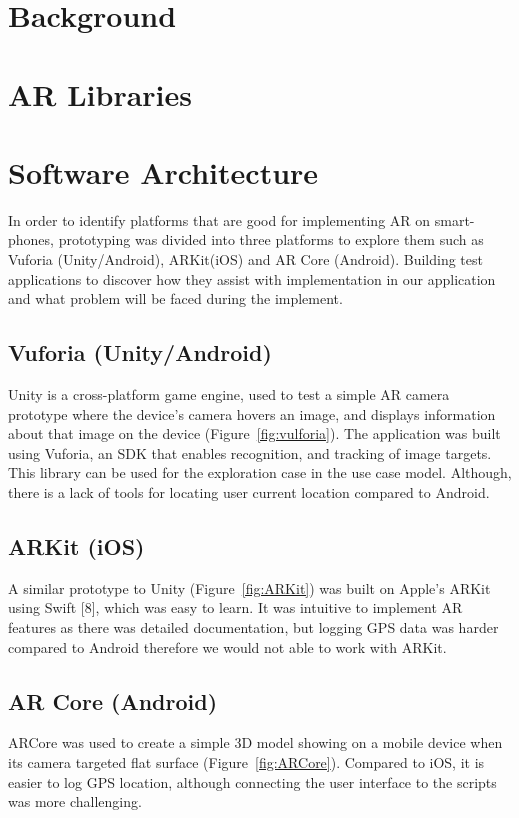 \section{Background}


\section{AR Libraries}


\section{Software Architecture}
In order to identify platforms that are good for implementing AR on smart- phones, prototyping was divided into three platforms to explore them such as Vuforia (Unity/Android), ARKit(iOS) and AR Core (Android). Building test applications to discover how they assist with implementation in our application and what problem will be faced during the implement.

\subsection{Vuforia (Unity/Android)}
Unity is a cross-platform game engine, used to test a simple AR camera prototype where the device’s camera hovers an image, and displays information about that image on the device (Figure~\ref{fig:vulforia}). The application was built using Vuforia, an SDK that enables recognition, and tracking of image targets. This library can be used for the exploration case in the use case model. Although, there is a lack of tools for locating user current location compared to Android.


\subsection{ARKit (iOS)}
A similar prototype to Unity (Figure~\ref{fig:ARKit}) was built on Apple’s ARKit using Swift [8], which was easy to learn. It was intuitive to implement AR features as there was detailed documentation, but logging GPS data was harder compared to Android therefore we would not able to work with ARKit.


\subsection{AR Core (Android)}
ARCore was used to create a simple 3D model showing on a mobile device when its camera targeted flat surface (Figure~\ref{fig:ARCore}). Compared to iOS, it is easier to log GPS location, although connecting the user interface to the scripts was more challenging.

